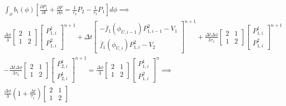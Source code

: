 \documentclass[12pt,a4paper,pagesize=pdftex]{scrartcl}
\begin{document}
\begin{multline*}
    \int_\phi b_i\left(\phi\right) \left[\frac{\partial P_1}{\partial t} + \frac{\partial F}{\partial \phi} = \frac{1}{\tau_2} P_2 - \frac{1}{\tau_1} P_1 \right] d\phi \implies \\
    \frac{\Delta \phi}{3}
    \begin{bmatrix}
        2 & 1 \\
        1 & 2
    \end{bmatrix}
    \begin{bmatrix}
        P_{1,i}^1 \\
        P_{1,i}^2
    \end{bmatrix}^{n+1}
    + \Delta t
    \begin{bmatrix}
        - \overline{f}_1\left(\phi_{U,i-1}\right) P^2_{1,i-1} - V_1 \\
        \overline{f}_1\left(\phi_{U,i}\right) P^2_{1,i} - V_2
    \end{bmatrix}^{n+1}
    + \frac{\Delta t \Delta \phi}{3 \tau_1}
    \begin{bmatrix}
        2 & 1 \\
        1 & 2
    \end{bmatrix}
    \begin{bmatrix}
        P_{1,i}^1 \\
        P_{1,i}^2
    \end{bmatrix}^{n+1} \\
    - \frac{\Delta t \Delta \phi}{3 \tau_2}
    \begin{bmatrix}
        2 & 1 \\
        1 & 2
    \end{bmatrix}
    \begin{bmatrix}
        P_{2,i}^1 \\
        P_{2,i}^1
    \end{bmatrix}^{n+1}
    = \frac{\Delta \phi}{3}
    \begin{bmatrix}
        2 & 1 \\
        1 & 2
    \end{bmatrix}
    \begin{bmatrix}
        P_{1,i}^1 \\
        P_{1,i}^2
    \end{bmatrix}^n
    \implies \\
    \frac{\Delta \phi}{3}\left(1 + \frac{\Delta t}{\tau_1}\right)
    \begin{bmatrix}
        2 & 1 \\
        1 & 2
    \end{bmatrix}

\end{multline*}
\end{document}
